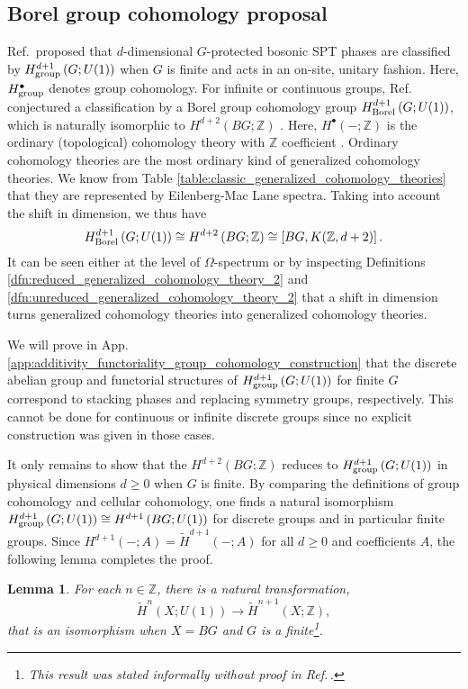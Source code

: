 \documentclass[sort&compress]{elsarticle}
\theoremstyle{theoremstyle}
\newtheorem{lem}[nul]{Lemma}
\theoremstyle{framedtheoremstyle}
\theoremstyle{definitionstyle}
\theoremstyle{definitionstyle}
\theoremstyle{definitionstyle}
\theoremstyle{definitionstyle}
\theoremstyle{nameddefinitionstyle}
\theoremstyle{framednameddefinitionstyle}
\theoremstyle{proofstyle}
\theoremstyle{definitionstyle}
\newcommand{\fromto}{\rightarrow}
\newcommand{\ZZZ}{\mathbb{Z}}
\newcommand{\isomorphic}{\cong}
\newcommand{\paren}[1]{\left( #1 \right)}
\newcommand{\brackets}[1]{\left[ #1 \right]}
\begin{document}
\begin{appendices}
\subsection{Borel group cohomology proposal\label{subapp:Borel_group_cohomology_proposal}}

Ref.\,\cite{Wen_Boson} proposed that $d$-dimensional $G$-protected bosonic SPT phases are classified by $H^{d+1}_{\rm group}\paren{G; U(1)}$ when $G$ is finite and acts in an on-site, unitary fashion. Here, $H^\bullet_{\rm group}$ denotes group cohomology. For infinite or continuous groups, Ref.\,\cite{Wen_Boson} conjectured a classification by a Borel group cohomology group $H_{\rm Borel}^{d+1}\paren{G;U(1)}$, which is naturally isomorphic to $H^{d+2}\paren{BG;\ZZZ}$ \cite{Borel_group_cohomology}. Here, $H^\bullet\paren{-;\ZZZ}$ is the ordinary (topological) cohomology theory with $\ZZZ$ coefficient \cite{Hatcher}. Ordinary cohomology theories are the most ordinary kind of generalized cohomology theories. We know from Table \ref{table:classic_generalized_cohomology_theories} that they are represented by Eilenberg-Mac Lane spectra. Taking into account the shift in dimension, we thus have
\begin{equation}
H_{\rm Borel}^{d+1}\paren{G;U(1)} \isomorphic H^{d+2}\paren{BG; \ZZZ} \isomorphic \brackets{BG, K(\ZZZ, d+2)}.
\end{equation}
It can be seen either at the level of $\Omega$-spectrum or by inspecting Definitions \ref{dfn:reduced_generalized_cohomology_theory_2} and \ref{dfn:unreduced_generalized_cohomology_theory_2} that a shift in dimension turns generalized cohomology theories into generalized cohomology theories. 

We will prove in App.\,\ref{app:additivity_functoriality_group_cohomology_construction} that the discrete abelian group and functorial structures of $H^{d+1}_{\rm group}\paren{G;U(1)}$ for finite $G$ correspond to stacking phases and replacing symmetry groups, respectively. This cannot be done for continuous or infinite discrete groups since no explicit construction was given in those cases.

It only remains to show that the $H^{d+2}\paren{BG;\ZZZ}$ reduces to $H^{d+1}_{\rm group}\paren{G;U(1)}$ in physical dimensions $d\geq 0$ when $G$ is finite. By comparing the definitions of group cohomology and cellular cohomology, one finds a natural isomorphism $H^{d+1}_{\rm group}\paren{G; U(1)} \isomorphic H^{d+1}\paren{BG; U(1)}$ for discrete groups and in particular finite groups. Since $H^{d+1}(-;A) = \widetilde H^{d+1}(-;A)$ for all $d\geq 0$ and coefficients $A$, the following lemma completes the proof.
\begin{lem}
For each $n\in \ZZZ$, there is a natural transformation,
\begin{equation}
\widetilde H^n\paren{X; U(1)} \fromto \widetilde H^{n+1}\paren{X; \ZZZ},
\end{equation}
that is an isomorphism when $X = BG$ and $G$ is a finite\footnote{This result was stated informally without proof in Ref.\,\cite{Kitaev_KITP}.}. \label{lem:Bockstein_homomorphism}
\end{lem}


\end{appendices}
\end{document}
